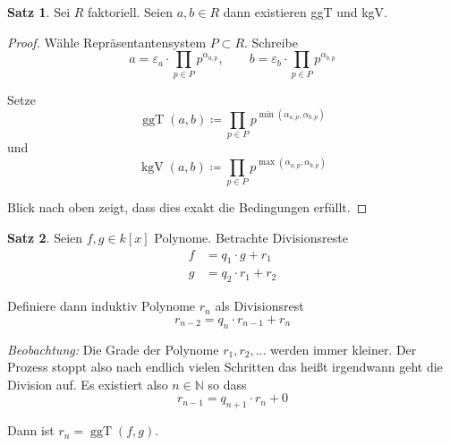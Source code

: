 \documentclass[12pt,parskip=full]{scrartcl}
\newcommand{\setN}{\mathbb{N}}
\theoremstyle{definition}
\newtheorem{theorem}{Satz}[section]
\theoremstyle{remark}
\begin{document}
	\begin{theorem}
		Sei $R$ faktoriell. Seien $a,b \in R$ dann existieren ggT und kgV.
	\end{theorem}

	\begin{proof}
		Wähle Repräsentantensystem $P \subset R$. Schreibe
		\begin{equation*}
			a = \varepsilon_a \cdot \prod_{p \in P} p^{\alpha_{a,p}}, \qquad b = \varepsilon_b \cdot \prod_{p \in P} p^{\alpha_{b,p}}
		\end{equation*}
		
		Setze
		\begin{equation*}
			\operatorname{ggT}(a,b) \coloneqq \prod_{p \in P} p^{\min(\alpha_{a,p}, \alpha_{b,p})}
		\end{equation*}
		und
		\begin{equation*}
			\operatorname{kgV}(a,b) \coloneqq \prod_{p \in P} p^{\max(\alpha_{a,p}, \alpha_{b,p})}
		\end{equation*}
		
		Blick nach oben zeigt, dass dies exakt die Bedingungen erfüllt.
	\end{proof}

	\begin{theorem}
		Seien $f,g \in k[x]$ Polynome. Betrachte Divisionsreste
		\begin{align*}
			f &= q_1 \cdot g + r_1 \tag{1}\\
			g &= q_2 \cdot r_1 + r_2 \tag{2}
		\end{align*}
		
		Definiere dann induktiv Polynome $r_n$ als Divisionsrest
		\begin{equation*}
			r_{n-2} = q_n \cdot r_{n-1} + r_n \tag{n}
		\end{equation*}
		
		\textit{Beobachtung:} Die Grade der Polynome $r_1, r_2, \dots$ werden immer kleiner. Der Prozess stoppt also nach endlich vielen Schritten das heißt irgendwann geht die Division auf. Es existiert also $n \in \setN$ so dass
		\begin{equation*}
			r_{n-1} = q_{n+1} \cdot r_n + 0 \tag{n+1}
		\end{equation*}
		
		Dann ist $r_n = \operatorname{ggT}(f,g)$.
	\end{theorem}
\end{document}
